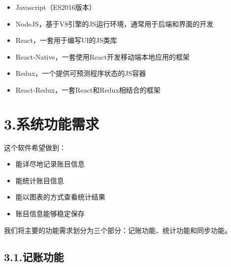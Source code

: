 \documentclass{article}
\begin{document}
\begin{itemize}[noitemsep,topsep=\mdcompacttopsep]%

\item{}Javascript（ES2016版本）%

\item{}NodeJS，基于V8引擎的JS运行环境，通常用于后端和界面的开发%

\item{}React，一套用于编写UI的JS类库%

\item{}React-Native，一套使用React开发移动端本地应用的框架%

\item{}Redux，一个提供可预测程序状态的JS容器%

\item{}React-Redux，一套React和Redux相结合的框架%
\end{itemize}%

\section{3.\hspace*{0.5em}系统功能需求}\label{section}%

\noindent{}这个软件希望做到：%

\begin{itemize}[noitemsep,topsep=\mdcompacttopsep]%

\item{}能详尽地记录账目信息%

\item{}能统计账目信息%

\item{}能以图表的方式查看统计结果%

\item{}账目信息能够稳定保存%
\end{itemize}%

\noindent{}我们将主要的功能需求划分为三个部分：记账功能、统计功能和同步功能。%

\subsection{3.1.\hspace*{0.5em}记账功能}\label{section}%
\end{document}
